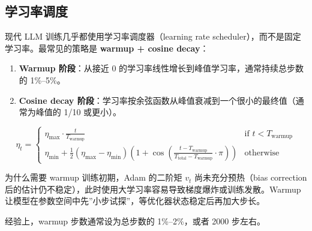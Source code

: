 \subsection{学习率调度}

现代 LLM 训练几乎都使用学习率调度器（learning rate scheduler），而不是固定学习率。最常见的策略是 \textbf{warmup + cosine decay}：

\begin{enumerate}
    \item \textbf{Warmup 阶段}：从接近 0 的学习率线性增长到峰值学习率，通常持续总步数的 1\%--5\%。
    \item \textbf{Cosine decay 阶段}：学习率按余弦函数从峰值衰减到一个很小的最终值（通常为峰值的 1/10 或更小）。
\end{enumerate}

$$
\eta_t = \begin{cases}
\eta_{\max} \cdot \frac{t}{T_{\text{warmup}}} & \text{if } t < T_{\text{warmup}} \\[6pt]
\eta_{\min} + \frac{1}{2}(\eta_{\max} - \eta_{\min})\left(1 + \cos\left(\frac{t - T_{\text{warmup}}}{T_{\text{total}} - T_{\text{warmup}}} \cdot \pi\right)\right) & \text{otherwise}
\end{cases}
$$

\begin{knowledgebox}{为什么需要 warmup}
训练初期，Adam 的二阶矩 $v_t$ 尚未充分预热（bias correction 后的估计仍不稳定），此时使用大学习率容易导致梯度爆炸或训练发散。Warmup 让模型在参数空间中先”小步试探”，等优化器状态稳定后再加大步长。

经验上，warmup 步数通常设为总步数的 1\%--2\%，或者 2000 步左右。
\end{knowledgebox}

